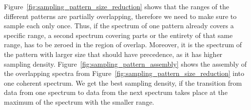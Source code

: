 
Figure~\ref{fig:sampling_pattern_size_reduction} shows that the \wavenumber
ranges of the different patterns are partially overlapping,
therefore we need to make sure to sample each \wavenumber only once.
Thus, if the spectrum of one pattern already covers a specific
\wavenumber range, a second spectrum covering parts or the entirety of that same
range, has to be zeroed in the region of overlap. Moreover, it is the spectrum
of the pattern with larger size that should have precedence, as it has higher
sampling density.
Figure~\ref{fig:sampling_pattern_assembly} shows the assembly of the overlapping
spectra from Figure~\ref{fig:sampling_pattern_size_reduction} into one coherent
spectrum. We get the best sampling density, if the transition from data from
one spectrum to data from the next spectrum takes place at the maximum
\wavenumber of the spectrum with the smaller \wavenumber range.
%

